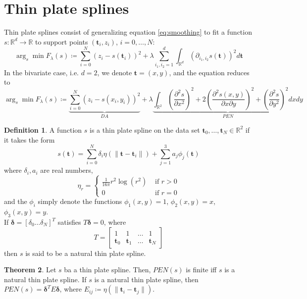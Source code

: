 \documentclass[12pt, openany]{report}
\newcommand{\R}{\mathbb{R}}
\theoremstyle{definition}
\newtheorem{thm}{Theorem}[chapter]
\newtheorem{definition}[thm]{Definition}
\begin{document}
\section{Thin plate splines}
Thin plate splines consist of generalizing equation \eqref{eq:smoothing} to fit a function $s:\R^d\rightarrow \R$ to support points $(\textbf{t}_i,z_i)$, $i=0,\dots, N$:
\begin{equation}\label{eq:smoothing-tps}
    \arg_s \min F_\lambda (s)\coloneqq \sum_{i=0}^N (z_i-s(\textbf{t}_i))^2 + \lambda \sum_{i_1,i_2=1}^d \int_{\R^d} \left(\partial_{i_1,i_2}s(\textbf{t})\right)^2d\textbf{t}
\end{equation}
In the bivariate case, i.e. $d=2$, we denote $\textbf{t}=(x,y)$, and the equation reduces to 
\begin{equation}
    \arg_s \min F_\lambda (s)\coloneqq \underbrace{\sum_{i=0}^N (z_i-s(x_i,y_i))^2}_{DA} + \lambda \underbrace{\int_{\R^2} \left(\frac{\partial^2s}{\partial x^2}\right)^2 + 2\left(\frac{\partial^2 s(x,y)}{\partial x\partial y}\right)^2 + \left(\frac{\partial^2 s}{\partial y^2}\right)^2 dxdy}_{PEN}
\end{equation}
\begin{definition}\label{def:tps}
    A function $s$ is a thin plate spline on the data set $\textbf{t}_0,\dots,\textbf{t}_N\in \R^2$ if it takes the form
    \begin{equation}
        s(\textbf{t}) = \sum_{i=0}^N \delta_i \eta (\lVert \textbf{t}-\textbf{t}_i\rVert) + \sum_{j=1}^3 a_j\phi_j(\textbf{t})
    \end{equation}
    where $\delta_i,a_i$ are real numbers, 
    \begin{equation}
        \eta_r = \begin{cases}
            \frac{1}{16\pi} r^2\log(r^2) & \text{ if } r>0\\
            0& \text{ if } r=0
        \end{cases}
    \end{equation}
    and the $\phi_i$ simply denote the functions $\phi_1(x,y) = 1$, $\phi_2(x,y) = x$, $\phi_3(x,y)=y$. \\

    If $\pmb{\delta}=[\delta_0 \dots \delta_N]^T$ satisfies $T\pmb{\delta} = 0$, where 
    \begin{equation}
        T = \begin{bmatrix}
            1 & 1& \dots & 1\\
            \textbf{t}_0 & \textbf{t}_1 & \dots & \textbf{t}_N
        \end{bmatrix}
    \end{equation}
    then $s$ is said to be a natural thin plate spline.
\end{definition}
\begin{thm}
    Let $s$ ba a thin plate spline. Then, $PEN(s)$ is finite iff $s$ is a natural thin plate spline. If $s$ is a natural thin plate spline, then $PEN(s) = \pmb{\delta}^TE\pmb{\delta}$, where $E_{ij} \coloneqq \eta(\lVert \textbf{t}_i-\textbf{t}_j\rVert)$.
\end{thm}
\end{document}
